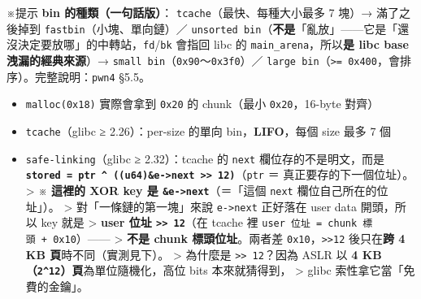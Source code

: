 \documentclass[10pt,a4paper]{article}
\providecommand{\tightlist}{%
  \setlength{\itemsep}{0pt}\setlength{\parskip}{0pt}}
\renewenvironment{quote}{%
  \begin{mdframed}[linewidth=0pt,innerleftmargin=0pt,innerrightmargin=0pt,
    innerbottommargin=0pt,innertopmargin=0pt,skipabove=0.55em,skipbelow=0.55em,
    leftmargin=0.9em,rightmargin=0.4em,startcode={\color{quotebar}\vrule width 2.6pt},%
    endcode={}]%
  \itshape\color{black}%
}{%
  \end{mdframed}%
}
\begin{document}
\begin{quote}
※提示 \textbf{bin 的種類（一句話版）}：
\texttt{tcache}（最快、每種大小最多 7 塊）→ 滿了之後掉到
\texttt{fastbin}（小塊、單向鏈）／
\texttt{unsorted\ \allowbreak{}bin}（\textbf{不是}「亂放」------它是「還沒決定要放哪」的中轉站，\texttt{fd}/\texttt{bk}
會指回 libc 的 \texttt{main\_\allowbreak{}arena}，所以\textbf{是 libc base
洩漏的經典來源}）→
\texttt{small\ \allowbreak{}bin}（\texttt{0x90}～\texttt{0x3f0}）／
\texttt{large\ \allowbreak{}bin}（\texttt{\textgreater{}\allowbreak{}=\ \allowbreak{}0x400}，會排序）。完整說明：\texttt{pwn4}
§5.5。
\end{quote}

\begin{itemize}
\tightlist
\item
  \texttt{malloc(0x18)} 實際會拿到 \texttt{0x20} 的 chunk（最小
  \texttt{0x20}，16-byte 對齊）
\item
  \texttt{tcache}（glibc ≥ 2.26）：per-size 的單向
  bin，\textbf{LIFO}，每個 size 最多 7 個
\item
  \texttt{safe-\allowbreak{}linking}（glibc ≥ 2.32）：tcache 的 \texttt{next}
  欄位存的不是明文，而是
  \textbf{\texttt{stored\ \allowbreak{}=\ \allowbreak{}ptr\ \allowbreak{}\^\allowbreak{}{}\allowbreak{}\ \allowbreak{}((u64)\&\allowbreak{}e-\allowbreak{}\textgreater{}\allowbreak{}next\ \allowbreak{}\textgreater{}\allowbreak{}\textgreater{}\allowbreak{}\ \allowbreak{}12)}}（\texttt{ptr}
  ＝ 真正要存的下一個位址）。 \textgreater{} ※ \textbf{這裡的 XOR key 是
  \texttt{\&\allowbreak{}e-\allowbreak{}\textgreater{}\allowbreak{}next}}（＝「這個 \texttt{next}
  欄位自己所在的位址」）。 \textgreater{} 對「一條鏈的第一塊」來說
  \texttt{e-\allowbreak{}\textgreater{}\allowbreak{}next} 正好落在 user data 開頭，所以 key 就是
  \textgreater{} \textbf{user 位址
  \texttt{\textgreater{}\allowbreak{}\textgreater{}\allowbreak{}\ \allowbreak{}12}}（在 tcache 裡
  \texttt{user\ \allowbreak{}位址\ \allowbreak{}=\ \allowbreak{}chunk\ \allowbreak{}標頭\ \allowbreak{}+\ \allowbreak{}0x10}）------ \textgreater{}
  \textbf{不是 chunk 標頭位址}。兩者差
  \texttt{0x10}，\texttt{\textgreater{}\allowbreak{}\textgreater{}\allowbreak{}12}
  後只在\textbf{跨 4 KB 頁}時不同（實測見下）。 \textgreater{} 為什麼是
  \texttt{\textgreater{}\allowbreak{}\textgreater{}\allowbreak{}\ \allowbreak{}12}？因為 ASLR 以 \textbf{4
  KB（\texttt{2\^\allowbreak{}{}\allowbreak{}12}）頁}為單位隨機化，高位 bits 本來就猜得到，
  \textgreater{} glibc 索性拿它當「免費的金鑰」。


\end{itemize}
\end{document}
